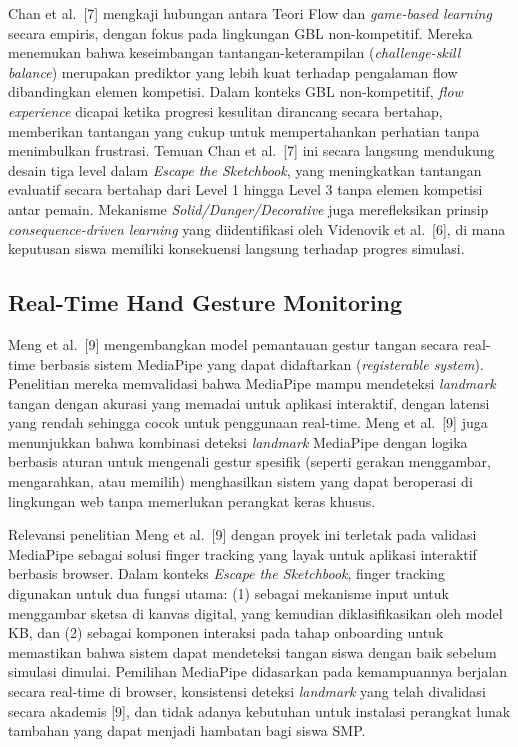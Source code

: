 \documentclass[10pt,twoside,openright]{report}
\begin{document}
Chan et al.\ [7] mengkaji hubungan antara Teori Flow dan \textit{game-based learning} secara empiris, dengan fokus pada lingkungan GBL non-kompetitif. Mereka menemukan bahwa keseimbangan tantangan-keterampilan (\textit{challenge-skill balance}) merupakan prediktor yang lebih kuat terhadap pengalaman flow dibandingkan elemen kompetisi. Dalam konteks GBL non-kompetitif, \textit{flow experience} dicapai ketika progresi kesulitan dirancang secara bertahap, memberikan tantangan yang cukup untuk mempertahankan perhatian tanpa menimbulkan frustrasi. Temuan Chan et al.\ [7] ini secara langsung mendukung desain tiga level dalam \textit{Escape the Sketchbook}, yang meningkatkan tantangan evaluatif secara bertahap dari Level 1 hingga Level 3 tanpa elemen kompetisi antar pemain. Mekanisme \textit{Solid/Danger/Decorative} juga merefleksikan prinsip \textit{consequence-driven learning} yang diidentifikasi oleh Videnovik et al.\ [6], di mana keputusan siswa memiliki konsekuensi langsung terhadap progres simulasi.

\subsection{Real-Time Hand Gesture Monitoring}
\label{subsec:penelitian-hand-gesture}

Meng et al.\ [9] mengembangkan model pemantauan gestur tangan secara real-time berbasis sistem MediaPipe yang dapat didaftarkan (\textit{registerable system}). Penelitian mereka memvalidasi bahwa MediaPipe mampu mendeteksi \textit{landmark} tangan dengan akurasi yang memadai untuk aplikasi interaktif, dengan latensi yang rendah sehingga cocok untuk penggunaan real-time. Meng et al.\ [9] juga menunjukkan bahwa kombinasi deteksi \textit{landmark} MediaPipe dengan logika berbasis aturan untuk mengenali gestur spesifik (seperti gerakan menggambar, mengarahkan, atau memilih) menghasilkan sistem yang dapat beroperasi di lingkungan web tanpa memerlukan perangkat keras khusus.

Relevansi penelitian Meng et al.\ [9] dengan proyek ini terletak pada validasi MediaPipe sebagai solusi finger tracking yang layak untuk aplikasi interaktif berbasis browser. Dalam konteks \textit{Escape the Sketchbook}, finger tracking digunakan untuk dua fungsi utama: (1) sebagai mekanisme input untuk menggambar sketsa di kanvas digital, yang kemudian diklasifikasikan oleh model KB, dan (2) sebagai komponen interaksi pada tahap onboarding untuk memastikan bahwa sistem dapat mendeteksi tangan siswa dengan baik sebelum simulasi dimulai. Pemilihan MediaPipe didasarkan pada kemampuannya berjalan secara real-time di browser, konsistensi deteksi \textit{landmark} yang telah divalidasi secara akademis [9], dan tidak adanya kebutuhan untuk instalasi perangkat lunak tambahan yang dapat menjadi hambatan bagi siswa SMP.
\end{document}
